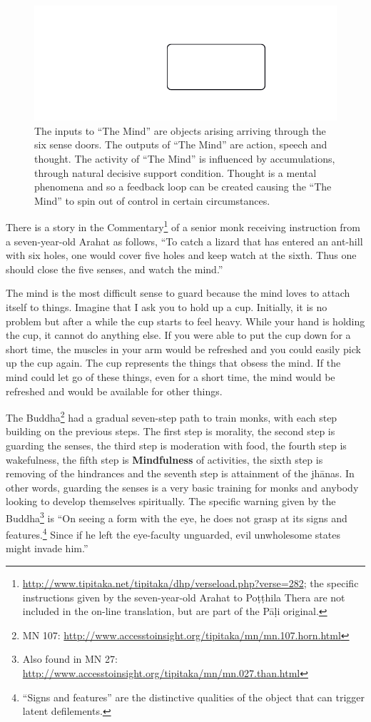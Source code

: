 \begin{figure}[h]
\centering
\includegraphics[width=0.7\linewidth]{./Diagrams/Feedback}
\caption{The inputs to “The Mind” are objects arising arriving through the six sense doors. The outputs of “The Mind” are action, speech and thought. The activity of “The Mind” is influenced by accumulations, through natural decisive support condition. Thought is a mental phenomena and so a feedback loop can be created causing the “The Mind” to spin out of control in certain circumstances.}
\label{fig:Feedback}
\end{figure}

There is a story in the Commentary\footnote{\url{http://www.tipitaka.net/tipitaka/dhp/verseload.php?verse=282}; the specific instructions given by the seven-year-old Arahat to Poṭṭhila Thera are not included in the on-line translation, but are part of the Pāḷi original.} of a senior monk receiving instruction from a seven-year-old Arahat as follows, “To catch a lizard that has entered an ant-hill with six holes, one would cover five holes and keep watch at the sixth. Thus one should close the five senses, and watch the mind.”

The mind is the most difficult sense to guard because the mind loves to attach itself to things. Imagine that I ask you to hold up a cup. Initially, it is no problem but after a while the cup starts to feel heavy. While your hand is holding the cup, it cannot do anything else. If you were able to put the cup down for a short time, the muscles in your arm would be refreshed and you could easily pick up the cup again. The cup represents the things that obsess the mind. If the mind could let go of these things, even for a short time, the mind would be refreshed and would be available for other things.

The Buddha\footnote{MN 107: \url{http://www.accesstoinsight.org/tipitaka/mn/mn.107.horn.html}} had a gradual seven-step path to train monks, with each step building on the previous steps. The first step is morality, the second step is guarding the senses, the third step is moderation with food, the fourth step is wakefulness, the fifth step is \textbf{Mindfulness} of activities, the sixth step is removing of the hindrances and the seventh step is attainment of the jhānas. In other words, guarding the senses is a very basic training for monks and anybody looking to develop themselves spiritually. The specific warning given by the Buddha\footnote{Also found in MN 27: \url{http://www.accesstoinsight.org/tipitaka/mn/mn.027.than.html}} is “On seeing a form with the eye, he does not grasp at its signs and features.\footnote{“Signs and features” are the distinctive qualities of the object that can trigger latent defilements.} Since if he left the eye-faculty unguarded, evil unwholesome states might invade him.”

